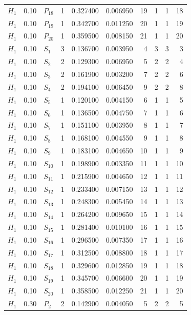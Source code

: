 \begin{longtable}{lrlrrrrrrr}
$H_1$ & 0.10 & $P_{18}$ & 1 & 0.327400 & 0.006950 & 19 & 1 & 1 & 18\\
$H_1$ & 0.10 & $P_{19}$ & 1 & 0.342700 & 0.011250 & 20 & 1 & 1 & 19\\
$H_1$ & 0.10 & $P_{20}$ & 1 & 0.359500 & 0.008150 & 21 & 1 & 1 & 20\\
$H_1$ & 0.10 & $S_{1}$ & 3 & 0.136700 & 0.003950 & 4 & 3 & 3 & 3\\
$H_1$ & 0.10 & $S_{2}$ & 2 & 0.129300 & 0.006950 & 5 & 2 & 2 & 4\\
$H_1$ & 0.10 & $S_{3}$ & 2 & 0.161900 & 0.003200 & 7 & 2 & 2 & 6\\
$H_1$ & 0.10 & $S_{4}$ & 2 & 0.194100 & 0.006450 & 9 & 2 & 2 & 8\\
$H_1$ & 0.10 & $S_{5}$ & 1 & 0.120100 & 0.004150 & 6 & 1 & 1 & 5\\
$H_1$ & 0.10 & $S_{6}$ & 1 & 0.136500 & 0.004750 & 7 & 1 & 1 & 6\\
$H_1$ & 0.10 & $S_{7}$ & 1 & 0.151100 & 0.003950 & 8 & 1 & 1 & 7\\
$H_1$ & 0.10 & $S_{8}$ & 1 & 0.168100 & 0.004550 & 9 & 1 & 1 & 8\\
$H_1$ & 0.10 & $S_{9}$ & 1 & 0.183100 & 0.004650 & 10 & 1 & 1 & 9\\
$H_1$ & 0.10 & $S_{10}$ & 1 & 0.198900 & 0.003350 & 11 & 1 & 1 & 10\\
$H_1$ & 0.10 & $S_{11}$ & 1 & 0.215900 & 0.004650 & 12 & 1 & 1 & 11\\
$H_1$ & 0.10 & $S_{12}$ & 1 & 0.233400 & 0.007150 & 13 & 1 & 1 & 12\\
$H_1$ & 0.10 & $S_{13}$ & 1 & 0.248300 & 0.005450 & 14 & 1 & 1 & 13\\
$H_1$ & 0.10 & $S_{14}$ & 1 & 0.264200 & 0.009650 & 15 & 1 & 1 & 14\\
$H_1$ & 0.10 & $S_{15}$ & 1 & 0.281400 & 0.010100 & 16 & 1 & 1 & 15\\
$H_1$ & 0.10 & $S_{16}$ & 1 & 0.296500 & 0.007350 & 17 & 1 & 1 & 16\\
$H_1$ & 0.10 & $S_{17}$ & 1 & 0.312500 & 0.008800 & 18 & 1 & 1 & 17\\
$H_1$ & 0.10 & $S_{18}$ & 1 & 0.329600 & 0.012850 & 19 & 1 & 1 & 18\\
$H_1$ & 0.10 & $S_{19}$ & 1 & 0.345700 & 0.006600 & 20 & 1 & 1 & 19\\
$H_1$ & 0.10 & $S_{20}$ & 1 & 0.358500 & 0.012250 & 21 & 1 & 1 & 20\\
$H_1$ & 0.30 & $P_{2}$ & 2 & 0.142900 & 0.004050 & 5 & 2 & 2 & 5\\

\end{longtable}
